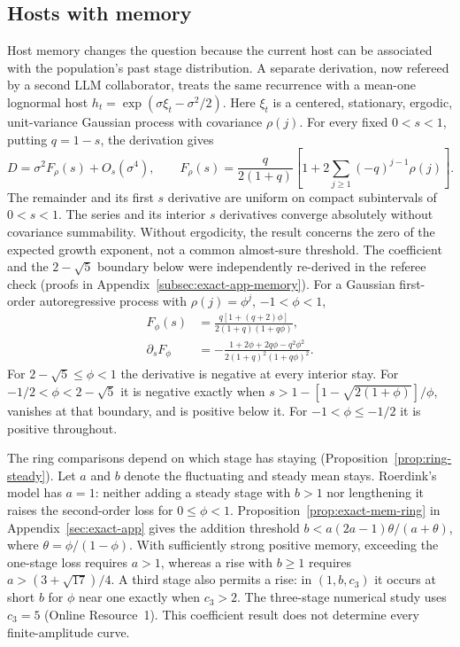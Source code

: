 \subsection{Hosts with memory}\label{subsec:exact-memory}

Host memory changes the question because the current host can be associated with the population's past stage distribution. A separate derivation, now refereed by a second LLM collaborator, treats the same recurrence with a mean-one lognormal host $h_t=\exp(\sigma\xi_t-\sigma^2/2)$. Here $\xi_t$ is a centered, stationary, ergodic, unit-variance Gaussian process with covariance $\rho(j)$. For every fixed $0<s<1$, putting $q=1-s$, the derivation gives
\begin{equation}
 D=\sigma^2F_\rho(s)+O_s(\sigma^4),\qquad
 F_\rho(s)=\frac{q}{2(1+q)}
 \left[1+2\sum_{j\geq1}(-q)^{j-1}\rho(j)\right].
 \label{eq:exact-memory-coefficient}
\end{equation}
The remainder and its first $s$ derivative are uniform on compact subintervals of $0<s<1$. The series and its interior $s$ derivatives converge absolutely without covariance summability. Without ergodicity, the result concerns the zero of the expected growth exponent, not a common almost-sure threshold. The coefficient and the $2-\sqrt5$ boundary below were independently re-derived in the referee check (proofs in Appendix~\ref{subsec:exact-app-memory}). For a Gaussian first-order autoregressive process with $\rho(j)=\phi^j$, $-1<\phi<1$,
\begin{equation}
\begin{split}
 F_\phi(s)&=\frac{q[1+(q+2)\phi]}{2(1+q)(1+q\phi)},\\
 \partial_sF_\phi&=-\frac{1+2\phi+2q\phi-q^2\phi^2}
 {2(1+q)^2(1+q\phi)^2}.
\end{split}
 \label{eq:exact-memory-AR}
\end{equation}
For $2-\sqrt5\leq\phi<1$ the derivative is negative at every interior stay. For $-1/2<\phi<2-\sqrt5$ it is negative exactly when $s>1-[1-\sqrt{2(1+\phi)}]/\phi$, vanishes at that boundary, and is positive below it. For $-1<\phi\leq-1/2$ it is positive throughout.

The ring comparisons depend on which stage has staying (Proposition~\ref{prop:ring-steady}). Let $a$ and $b$ denote the fluctuating and steady mean stays. Roerdink's model has $a=1$: neither adding a steady stage with $b>1$ nor lengthening it raises the second-order loss for $0\leq\phi<1$. Proposition~\ref{prop:exact-mem-ring} in Appendix~\ref{sec:exact-app} gives the addition threshold $b<a(2a-1)\theta/(a+\theta)$, where $\theta=\phi/(1-\phi)$. With sufficiently strong positive memory, exceeding the one-stage loss requires $a>1$, whereas a rise with $b\geq1$ requires $a>(3+\sqrt{17})/4$. A third stage also permits a rise: in $(1,b,c_3)$ it occurs at short $b$ for $\phi$ near one exactly when $c_3>2$. The three-stage numerical study uses $c_3=5$ (Online Resource~1). This coefficient result does not determine every finite-amplitude curve.

